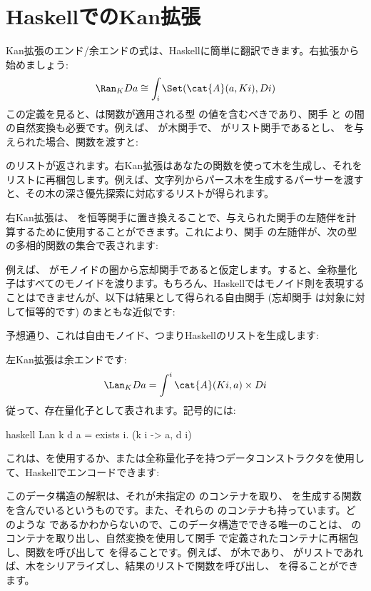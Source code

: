 \section{HaskellでのKan拡張}

Kan拡張のエンド/余エンドの式は、Haskellに簡単に翻訳できます。右拡張から始めましょう:
\[\Ran_{K}D a \cong \int_i \Set(\cat{A}(a, K i), D i)\]
この定義を見ると、は関数が適用される型  の値を含むべきであり、関手  と  の間の自然変換も必要です。例えば、 が木関手で、 がリスト関手であるとし、 を与えられた場合、関数を渡すと:

 のリストが返されます。右Kan拡張はあなたの関数を使って木を生成し、それをリストに再梱包します。例えば、文字列からパース木を生成するパーサーを渡すと、その木の深さ優先探索に対応するリストが得られます。

右Kan拡張は、 を恒等関手に置き換えることで、与えられた関手の左随伴を計算するために使用することができます。これにより、関手  の左随伴が、次の型の多相的関数の集合で表されます:

例えば、 がモノイドの圏から忘却関手であると仮定します。すると、全称量化子はすべてのモノイドを渡ります。もちろん、Haskellではモノイド則を表現することはできませんが、以下は結果として得られる自由関手 (忘却関手  は対象に対して恒等的です) のまともな近似です:

予想通り、これは自由モノイド、つまりHaskellのリストを生成します:

左Kan拡張は余エンドです:
\[\Lan_{K}D a = \int^i \cat{A}(K i, a)\times{}D i\]
従って、存在量化子として表されます。記号的には:

\begin{snip}{haskell}
Lan k d a = exists i. (k i -> a, d i)
\end{snip}
これは、を使用するか、または全称量化子を持つデータコンストラクタを使用して、Haskellでエンコードできます:

このデータ構造の解釈は、それが未指定の  のコンテナを取り、 を生成する関数を含んでいるというものです。また、それらの  のコンテナも持っています。どのような  であるかわからないので、このデータ構造でできる唯一のことは、 のコンテナを取り出し、自然変換を使用して関手  で定義されたコンテナに再梱包し、関数を呼び出して  を得ることです。例えば、 が木であり、 がリストであれば、木をシリアライズし、結果のリストで関数を呼び出し、 を得ることができます。

